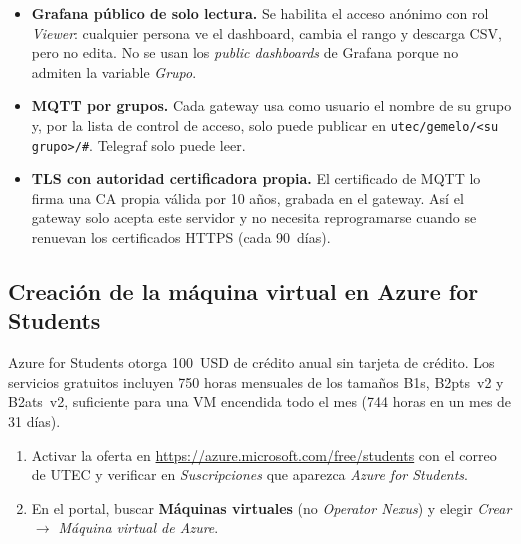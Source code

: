 \documentclass[11pt,a4paper]{article}
\begin{document}
\begin{itemize}
  \item \textbf{Grafana p\'ublico de solo lectura.} Se habilita el acceso an\'onimo con rol
        \emph{Viewer}: cualquier persona ve el dashboard, cambia el rango y descarga CSV, pero
        no edita. No se usan los \emph{public dashboards} de Grafana porque no admiten la
        variable \emph{Grupo}.
  \item \textbf{MQTT por grupos.} Cada gateway usa como usuario el nombre de su grupo y, por
        la lista de control de acceso, solo puede publicar en
        \texttt{utec/gemelo/<su grupo>/\#}. Telegraf solo puede leer.
  \item \textbf{TLS con autoridad certificadora propia.} El certificado de MQTT lo firma una
        CA propia v\'alida por 10 a\~nos, grabada en el gateway. As\'i el gateway solo acepta
        este servidor y no necesita reprogramarse cuando se renuevan los certificados
        HTTPS (cada 90~d\'ias).
\end{itemize}

\subsection{Creaci\'on de la m\'aquina virtual en Azure for Students}

Azure for Students otorga 100~USD de cr\'edito anual sin tarjeta de cr\'edito. Los servicios
gratuitos incluyen 750 horas mensuales de los tama\~nos B1s, B2pts~v2 y B2ats~v2, suficiente
para una VM encendida todo el mes (744 horas en un mes de 31 d\'ias).

\begin{enumerate}
  \item Activar la oferta en \url{https://azure.microsoft.com/free/students} con el correo
        de UTEC y verificar en \emph{Suscripciones} que aparezca \emph{Azure for Students}.
  \item En el portal, buscar \textbf{M\'aquinas virtuales} (no \emph{Operator Nexus}) y
        elegir \emph{Crear $\rightarrow$ M\'aquina virtual de Azure}.
\end{enumerate}
\end{document}

